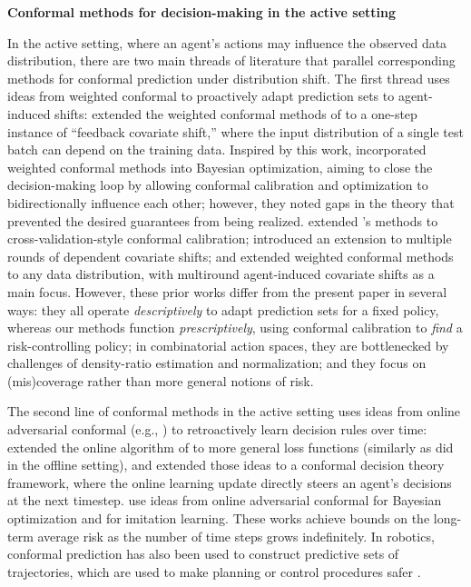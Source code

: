 \textbf{Conformal methods for decision-making in the active setting}

In the active setting, where an agent's actions may influence the observed data distribution, there are two main threads of literature that parallel corresponding methods for conformal prediction under distribution shift. The first thread uses ideas from weighted conformal to proactively adapt prediction sets to agent-induced shifts: \citet{fannjiang2022conformal} extended the weighted conformal methods of \citet{tibshirani2019conformal} to a one-step instance of  ``feedback covariate shift,'' where the input distribution of a single test batch can depend on the training data. 
Inspired by this work, \citet{stanton2023bayesian} incorporated weighted conformal methods into Bayesian optimization, aiming to close the decision-making loop by allowing conformal calibration and optimization to bidirectionally influence each other; however, they noted gaps in the theory that prevented the desired guarantees from being realized.  \citet{prinster2023jaws} extended \citet{fannjiang2022conformal}'s methods to cross-validation-style conformal calibration; \citet{nair2023randomization} introduced an extension to multiple rounds of dependent covariate shifts; and \citet{prinster2024conformal} extended weighted conformal methods to any data distribution, with multiround agent-induced covariate shifts as a main focus. However, these prior works differ from the present paper in several ways: they all operate \textit{descriptively} to adapt prediction sets for a fixed policy, whereas our methods function \textit{prescriptively}, using conformal calibration to \textit{find} a risk-controlling policy; in combinatorial action spaces, they are bottlenecked by challenges of density-ratio estimation and normalization; and they focus on (mis)coverage rather than more general notions of risk. 



The second line of conformal methods in the active setting uses ideas from online adversarial conformal (e.g., \citet{Gibbs2021-ed}) to retroactively learn decision rules over time: \citet{feldman2023achieving} extended the online algorithm of \citet{Gibbs2021-ed} to more general loss functions (similarly as \citet{bates2021distribution, angelopoulos2022conformal} did in the offline setting), and \citet{lekeufack2024conformal} extended those ideas to a conformal decision theory framework, where the online learning update directly steers an agent's decisions at the next timestep. \citet{zhang2024bayesian} use ideas from online adversarial conformal for Bayesian optimization and \citet{zhao2024conformalized} for imitation learning. These works achieve bounds on the long-term average risk as the number of time steps grows indefinitely.
In robotics, conformal prediction has also been used to construct predictive sets of trajectories, which are used to make planning or control procedures safer \cite{Lindemann2023-aj, Luo2024-na, sun2023, wang2025neurips, lindemann2024formal}.

